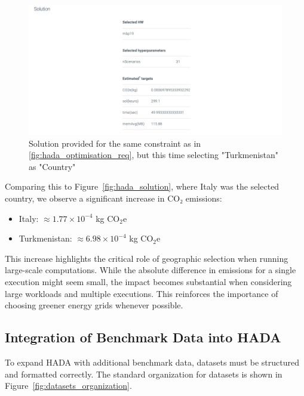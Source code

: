 \documentclass[a4paper,singleside,12pt]{report} %
\begin{document}
\begin{figure}[h!]
    \centering
    \includegraphics[width=\textwidth]{imgs/hada-solution-turkmenistan.png}
    \caption{Solution provided for the same constraint as in \ref{fig:hada_optimisation_req}, but this time selecting "Turkmenistan" as "Country"}
    \label{fig:hada_solution_turkmenistan}
\end{figure}

Comparing this to Figure~\ref{fig:hada_solution}, where Italy was the selected country, we observe a significant increase in CO₂ emissions:

\begin{itemize}
    \item Italy: $\approx 1.77 \times 10^{-4}$ kg CO$_2$e
    \item Turkmenistan: $\approx 6.98 \times 10^{-4}$ kg CO$_2$e
\end{itemize}

This increase highlights the critical role of geographic selection when running large-scale computations. While the absolute difference in emissions for a single execution might seem 
small, the impact becomes substantial when considering large workloads and multiple executions. This reinforces the importance of choosing greener energy grids whenever possible.

\subsection{Integration of Benchmark Data into HADA}

To expand HADA with additional benchmark data, datasets must be structured and formatted correctly. The standard organization for datasets is shown in Figure~\ref{fig:datasets_organization}.
\end{document}
